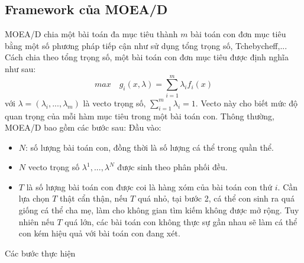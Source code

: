 \documentclass{article}
\begin{document}
\subsection{Framework của MOEA/D}
\gls{MOEA/D} \cite{zhang2007moea} chia một bài toán đa mục tiêu thành $m$ bài toán con đơn mục tiêu bằng một số phương pháp tiếp cận như sử dụng tổng trọng số, Tchebycheff,... Cách chia theo tổng trọng số, một bài toán con đơn mục tiêu được định nghĩa như sau:
\begin{equation}
    max \quad g_i(x, \lambda) =  \sum_{i=1}^m \lambda_i f_i(x)
\end{equation}
với $\lambda = (\lambda_i,..., \lambda_m)$ là vecto trọng số, $\sum_{i=1}^m\lambda_i = 1$. Vecto này cho biết mức độ quan trọng của mỗi hàm mục tiêu trong một bài toán con. 
Thông thường, \gls{MOEA/D} bao gồm các bước sau:
Đầu vào:
\begin{itemize}
    \item $N$: số lượng bài toán con, đồng thời là số lượng cá thể trong quần thể.
    \item $N$ vecto trọng số $\lambda^1,..., \lambda^N$ được sinh theo phân phối đều.
    \item $T$ là số lượng bài toán con được coi là hàng xóm của bài toán con thứ $i$. Cần lựa chọn $T$ thật cẩn thận, nếu $T$ quá nhỏ, tại bước 2, cá thể con sinh ra quá giống cá thể cha mẹ, làm cho không gian tìm kiếm không được mở rộng. Tuy nhiên nếu $T$ quá lớn, các bài toán con không thực sự gần nhau sẽ làm cá thể con kém hiệu quả với bài toán con đang xét.
\end{itemize}
Các bước thực hiện
\end{document}
